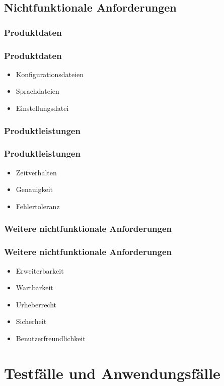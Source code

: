 \documentclass{beamer}
\begin{document}

\subsection{Nichtfunktionale Anforderungen}
\subsubsection{Produktdaten}
\begin{frame}
\frametitle{Produktdaten}
\begin{itemize}
\item Konfigurationsdateien
\item Sprachdateien
\item Einstellungsdatei
\end{itemize}
\end{frame}
\subsubsection{Produktleistungen}
\begin{frame}
\frametitle{Produktleistungen}
\begin{itemize}
\item Zeitverhalten
\item Genauigkeit
\item Fehlertoleranz
\end{itemize}
\end{frame}
\subsubsection{Weitere nichtfunktionale Anforderungen}
\begin{frame}
\frametitle{Weitere nichtfunktionale Anforderungen}
\begin{itemize}
\item Erweiterbarkeit
\item Wartbarkeit
\item Urheberrecht
\item Sicherheit
\item Benutzerfreundlichkeit
\end{itemize}
\end{frame}


\section{Testfälle und Anwendungsfälle}
\end{document}
